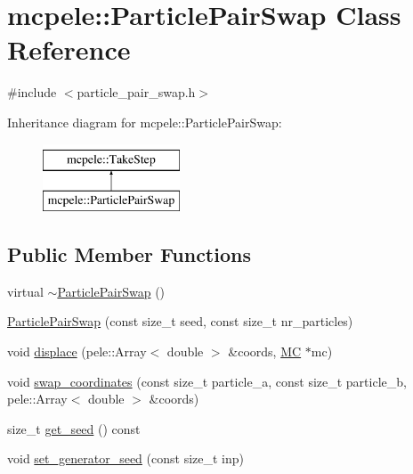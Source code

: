 \hypertarget{classmcpele_1_1ParticlePairSwap}{\section{mcpele\-:\-:\-Particle\-Pair\-Swap \-Class \-Reference}
\label{classmcpele_1_1ParticlePairSwap}
}


{\ttfamily \#include $<$particle\-\_\-pair\-\_\-swap.\-h$>$}

\-Inheritance diagram for mcpele\-:\-:\-Particle\-Pair\-Swap\-:\begin{figure}[H]
\begin{center}
\leavevmode
\includegraphics[height=2.000000cm]{classmcpele_1_1ParticlePairSwap}
\end{center}
\end{figure}
\subsection*{\-Public \-Member \-Functions}
\begin{DoxyCompactItemize}
\item 
virtual \hyperlink{classmcpele_1_1ParticlePairSwap_a391476c1f25fa3e194b69cfb542adea3}{$\sim$\-Particle\-Pair\-Swap} ()
\item 
\hyperlink{classmcpele_1_1ParticlePairSwap_a09aebe2a1c7a5e89be202def3bfded9f}{\-Particle\-Pair\-Swap} (const size\-\_\-t seed, const size\-\_\-t nr\-\_\-particles)
\item 
void \hyperlink{classmcpele_1_1ParticlePairSwap_ab4d35820381b34f5e4c993ad3817427b}{displace} (pele\-::\-Array$<$ double $>$ \&coords, \hyperlink{classmcpele_1_1MC}{\-M\-C} $\ast$mc)
\item 
void \hyperlink{classmcpele_1_1ParticlePairSwap_a075a55654c1cd9d6d80a361acc8014ed}{swap\-\_\-coordinates} (const size\-\_\-t particle\-\_\-a, const size\-\_\-t particle\-\_\-b, pele\-::\-Array$<$ double $>$ \&coords)
\item 
size\-\_\-t \hyperlink{classmcpele_1_1ParticlePairSwap_a1f3abbcf103328a91eeda411199fe478}{get\-\_\-seed} () const 
\item 
void \hyperlink{classmcpele_1_1ParticlePairSwap_a1142a8be79e9c872ab07f0f9995656fe}{set\-\_\-generator\-\_\-seed} (const size\-\_\-t inp)
\end{DoxyCompactItemize}


